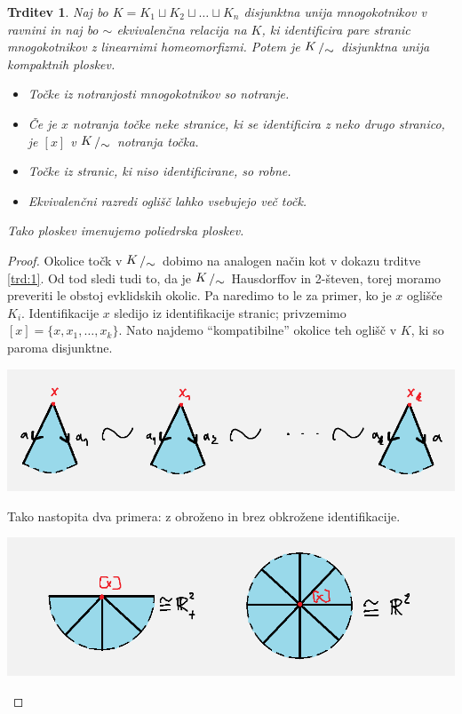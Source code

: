 \documentclass[10pt, a4paper]{article}
\newtheorem{trditev}[izr]{Trditev}
\newenvironment{noticeC}{%
  \tcolorbox[%
  notitle,
  empty,
  enhanced,  %
  breakable,
  coltext=black, 
  fontupper=\rmfamily,
  parbox=false,
  noparskip,
  sharp corners,
  boxrule=-1pt,  %
  frame hidden,
  left=7pt,  %
  right=7pt,
  top=5pt,
  bottom=5pt,
  before skip=2.5ex plus 2pt,
  after skip=2.5ex plus 2pt,
  overlay unbroken and last={%
  },
  ]}
{\endtcolorbox}
\newenvironment{dokaz}%
  {\begin{noticeC}\begin{proof}}%
  {\end{proof}\end{noticeC}}
\newcommand{\quot}[2]{{\raisebox{0.1em}{$#1$}\left/\raisebox{-0.2em}{$#2$}\right.}}
\begin{document}
\begin{trditev}
  Naj bo $K = K_1 \sqcup K_2 \sqcup \dots \sqcup K_n$ disjunktna unija mnogokotnikov v ravnini
  in naj bo $\sim$ ekvivalenčna relacija na $K$, ki identificira pare stranic 
  mnogokotnikov z linearnimi homeomorfizmi.
  Potem je $\quot{K}{\sim}$ disjunktna unija kompaktnih ploskev.
  \begin{itemize}
    \item Točke iz notranjosti mnogokotnikov so notranje.
    \item Če je $x$ notranja točke neke stranice, ki se identificira z neko drugo stranico,
    je $[x]$ v $\quot{K}{\sim}$ notranja točka.
    \item Točke iz stranic, ki niso identificirane, so robne.
    \item Ekvivalenčni razredi oglišč lahko vsebujejo več točk.
  \end{itemize}
  Tako ploskev imenujemo poliedrska ploskev.
\end{trditev}

\begin{dokaz}
  Okolice točk v $\quot{K}{\sim}$ dobimo na analogen način kot 
  v dokazu trditve \ref{trd:1}. Od tod sledi tudi to,
  da je $\quot{K}{\sim}$ Hausdorffov in 2-števen, torej moramo 
  preveriti le obstoj evklidskih okolic.
  Pa naredimo to le za primer, ko je $x$ oglišče $K_i$.
  Identifikacije $x$ sledijo iz identifikacije stranic; privzemimo 
  $[x] = \{x, x_1, \dots, x_k\}$. Nato najdemo "`kompatibilne"'
  okolice teh oglišč v $K$, ki so paroma disjunktne.
  \begin{center}
    \includegraphics[scale=0.7]{dokaz6.png}
  \end{center}
  Tako nastopita dva primera: z obroženo in brez obkrožene identifikacije.
  \begin{center}
    \includegraphics[scale=0.6]{dokaz7.png}
  \end{center}  
\end{dokaz}
\end{document}
